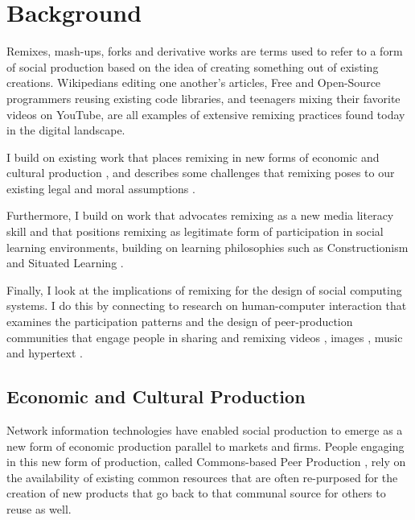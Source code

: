 \section{Background}

Remixes, mash-ups, forks and derivative works are terms used to refer to a form of social production based on the idea of creating something out of existing creations.
Wikipedians editing one another's articles, Free and Open-Source programmers reusing existing code libraries, and teenagers mixing their favorite videos on YouTube, are all examples of extensive remixing practices found today in the digital landscape.

I build on existing work that places remixing in new forms of economic and cultural production \citep{benkler_wealth_2006, jenkins_convergence_2006,manovich_remix_2005,sinnreich_ethics_2009}, and describes some challenges that remixing poses to our existing legal and moral assumptions \citep{lessig_remix:_2008, posner_little_2007}.

Furthermore, I build on work that advocates remixing as a new media literacy skill \citep{ito_hanging_2010, jenkins_confronting_2009, livingstone_taking_2008, perkel_copy_2008} and that positions remixing as legitimate form of participation in social learning environments, building on learning philosophies such as Constructionism \citep{papert_mindstorms_1980} and Situated Learning \citep{lave_situated_1991}.

Finally, I look at the implications of remixing for the design of social computing systems. I do this by connecting to research on human-computer interaction that examines the participation patterns and the design of peer-production communities that engage people in sharing and remixing videos \citep{diakopoulos_evolution_2007,shaw_community_2006}, images \citep{seneviratne_policy-aware_2009}, music \citep{cheliotis_analysis_2009} and hypertext \citep{viegas_studying_2004}.

\subsection{Economic and Cultural Production}

Network information technologies have enabled social production to emerge as a new form of economic production parallel to markets and firms.
People engaging in this new form of production, called Commons-based Peer Production \citep{benkler_coases_2002}, rely on the availability of existing common resources that are often re-purposed for the creation of new products that go back to that communal source for others to reuse as well.

